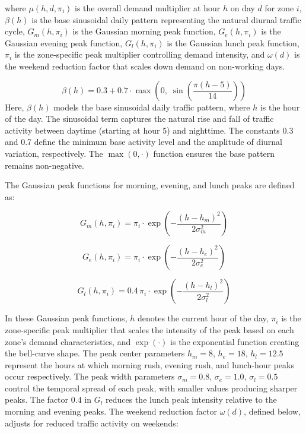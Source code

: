 \documentclass[journal]{IEEEtran}
\begin{document}
\noindent where $\mu(h, d, \pi_i)$ is the overall demand multiplier at hour $h$ on day $d$ for zone $i$, $\beta(h)$ is the base sinusoidal daily pattern representing the natural diurnal traffic cycle, $G_m(h, \pi_i)$ is the Gaussian morning peak function, $G_e(h, \pi_i)$ is the Gaussian evening peak function, $G_l(h, \pi_i)$ is the Gaussian lunch peak function, $\pi_i$ is the zone-specific peak multiplier controlling demand intensity, and $\omega(d)$ is the weekend reduction factor that scales down demand on non-working days.

\begin{equation}
\beta(h) = 0.3 + 0.7 \cdot \max\!\left(0,\; \sin\!\left(\frac{\pi(h - 5)}{14}\right)\right)
\label{eq:base_pattern}
\end{equation}
\noindent Here, $\beta(h)$ models the base sinusoidal daily traffic pattern, where $h$ is the hour of the day. The sinusoidal term captures the natural rise and fall of traffic activity between daytime (starting at hour 5) and nighttime. The constants 0.3 and 0.7 define the minimum base activity level and the amplitude of diurnal variation, respectively. The $\max(0, \cdot)$ function ensures the base pattern remains non-negative.

The Gaussian peak functions for morning, evening, and lunch peaks are defined as:

\begin{equation}
G_m(h, \pi_i) = \pi_i \cdot \exp\!\left(-\frac{(h - h_m)^2}{2\sigma_m^2}\right)
\label{eq:morning_peak}
\end{equation}

\begin{equation}
G_e(h, \pi_i) = \pi_i \cdot \exp\!\left(-\frac{(h - h_e)^2}{2\sigma_e^2}\right)
\label{eq:evening_peak}
\end{equation}

\begin{equation}
G_l(h, \pi_i) = 0.4\,\pi_i \cdot \exp\!\left(-\frac{(h - h_l)^2}{2\sigma_l^2}\right)
\label{eq:lunch_peak}
\end{equation}

\noindent In these Gaussian peak functions, $h$ denotes the current hour of the day, $\pi_i$ is the zone-specific peak multiplier that scales the intensity of the peak based on each zone's demand characteristics, and $\exp(\cdot)$ is the exponential function creating the bell-curve shape. The peak center parameters $h_m = 8$, $h_e = 18$, $h_l = 12.5$ represent the hours at which morning rush, evening rush, and lunch-hour peaks occur respectively. The peak width parameters $\sigma_m = 0.8$, $\sigma_e = 1.0$, $\sigma_l = 0.5$ control the temporal spread of each peak, with smaller values producing sharper peaks. The factor $0.4$ in $G_l$ reduces the lunch peak intensity relative to the morning and evening peaks. The weekend reduction factor $\omega(d)$, defined below, adjusts for reduced traffic activity on weekends:
\end{document}
